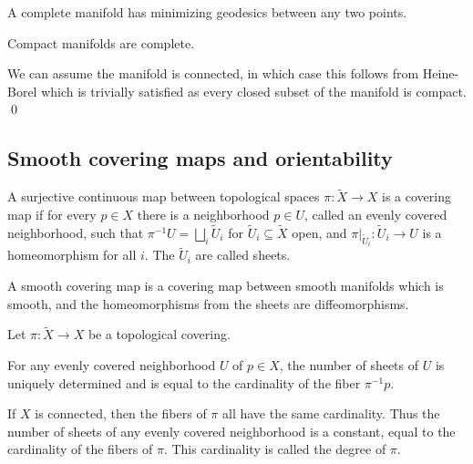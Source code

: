 \enote

\bcoro

    A complete manifold has minimizing geodesics between any two points.

\ecoro

\bcoro

    Compact manifolds are complete.

\ecoro

\bproof

    We can assume the manifold is connected, in which case this follows from Heine-Borel which is trivially satisfied as every closed subset
    of the manifold is compact.
    \qed

\eproof

\subsection{Smooth covering maps and orientability}

\bdefn

    A surjective continuous map between topological spaces $\pi\colon\tilde X\to X$ is a {\emphcolor covering map} if for every $p\in X$ there is a neighborhood $p\in U$,
    called an {\emphcolor evenly covered neighborhood}, such that $\pi^{-1}U=\bigsqcup_i\tilde U_i$ for $\tilde U_i\subseteq\tilde X$ open, and
    $\pi|_{\tilde U_i}\colon\tilde U_i\to U$ is a homeomorphism for all $i$.
    The $\tilde U_i$ are called {\emphcolor sheets}.

    A {\emphcolor smooth covering map} is a covering map between smooth manifolds which is smooth, and the homeomorphisms from the sheets are diffeomorphisms.

\edefn

\bprop

    Let $\pi\colon\tilde X\to X$ be a topological covering.
    \benum
        \item For any evenly covered neighborhood $U$ of $p\in X$, the number of sheets of $U$ is uniquely determined and is equal to the cardinality of the fiber $\pi^{-1}p$.
        \item If $X$ is connected, then the fibers of $\pi$ all have the same cardinality.
        Thus the number of sheets of any evenly covered neighborhood is a constant, equal to the cardinality of the fibers of $\pi$.
        This cardinality is called the {\emphcolor degree} of $\pi$.
    \eenum

\eprop

\bproof

